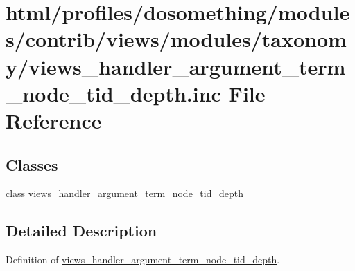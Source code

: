 \hypertarget{views__handler__argument__term__node__tid__depth_8inc}{
\section{html/profiles/dosomething/modules/contrib/views/modules/taxonomy/views\_\-handler\_\-argument\_\-term\_\-node\_\-tid\_\-depth.inc File Reference}
\label{views__handler__argument__term__node__tid__depth_8inc}
}
\subsection*{Classes}
\begin{DoxyCompactItemize}
\item 
class \hyperlink{classviews__handler__argument__term__node__tid__depth}{views\_\-handler\_\-argument\_\-term\_\-node\_\-tid\_\-depth}
\end{DoxyCompactItemize}


\subsection{Detailed Description}
Definition of \hyperlink{classviews__handler__argument__term__node__tid__depth}{views\_\-handler\_\-argument\_\-term\_\-node\_\-tid\_\-depth}. 